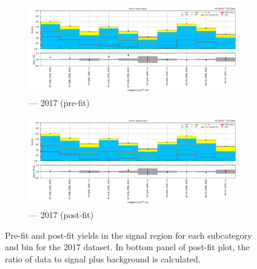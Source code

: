 \begin{figure}[htbp]
    \centering
    \begin{subfigure}[b]{0.9\textwidth}
        \includegraphics[width=\textwidth]{figures/mountain_ranges/2017/VH/SR_tree_prefit-abs_values_VH_cats.pdf}
        \caption{\VH --- 2017 (pre-fit)}
    \end{subfigure}

    \begin{subfigure}[b]{0.9\textwidth}
        \includegraphics[width=\textwidth]{figures/mountain_ranges/2017/VH/SR_tree_fit_s-abs_values_VH_cats.pdf}
        \caption{\VH --- 2017 (post-fit)}
    \end{subfigure}
    \caption[Pre-fit and post-fit yields in the signal region for each \VH subcategory and \ptmiss bin for the 2017 dataset]{Pre-fit and post-fit yields in the signal region for each \VH subcategory and \ptmiss bin for the 2017 dataset. In bottom panel of post-fit plot, the ratio of data to signal plus background is calculated.}
    \label{fig:htoinv_mountain_range_VH_2017}
\end{figure}

